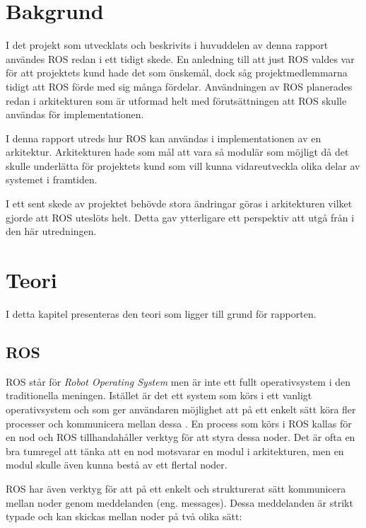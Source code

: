 \section{Bakgrund}
\label{sec:background-lundberg}

I det projekt som utvecklats och beskrivits i huvuddelen av denna rapport användes ROS redan i ett tidigt skede. En anledning till att just ROS valdes var för att projektets kund hade det som önskemål, dock såg projektmedlemmarna tidigt att ROS förde med sig många fördelar. Användningen av ROS planerades redan i arkitekturen som är utformad helt med förutsättningen att ROS skulle användas för implementationen.

I denna rapport utreds hur ROS kan användas i implementationen av en arkitektur. Arkitekturen hade som mål att vara så modulär som möjligt då det skulle underlätta för projektets kund som vill kunna vidareutveckla olika delar av systemet i framtiden.

I ett sent skede av projektet behövde stora ändringar göras i arkitekturen vilket gjorde att ROS uteslöts helt. Detta gav ytterligare ett perspektiv att utgå från i den här utredningen.


\section{Teori}
\label{sec:theory-lundberg}

I detta kapitel presenteras den teori som ligger till grund för rapporten.

\subsection{ROS}
ROS står för \textit{Robot Operating System} men är inte ett fullt operativsystem i den traditionella meningen. Istället är det ett system som körs i ett vanligt operativsystem och som ger användaren möjlighet att på ett enkelt sätt köra fler processer och kommunicera mellan dessa \cite{quigley2009ros}. En process som körs i ROS kallas för en nod och ROS tillhandahåller verktyg för att styra dessa noder. Det är ofta en bra tumregel att tänka att en nod motsvarar en modul i arkitekturen, men en modul skulle även kunna bestå av ett flertal noder.

ROS har även verktyg för att på ett enkelt och strukturerat sätt kommunicera mellan noder genom meddelanden (eng. messages). Dessa meddelanden är strikt typade och kan skickas mellan noder på två olika sätt:

